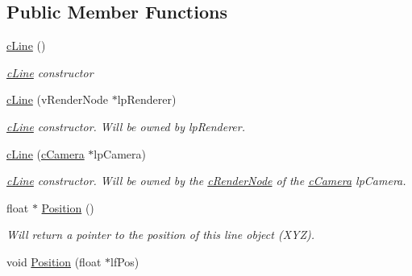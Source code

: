 \subsection*{Public Member Functions}
\begin{DoxyCompactItemize}
\item 
\hypertarget{classc_line_afc96602bef17f3d03af9685532af395d}{
\hyperlink{classc_line_afc96602bef17f3d03af9685532af395d}{cLine} ()}
\label{classc_line_afc96602bef17f3d03af9685532af395d}

\begin{DoxyCompactList}\small\item\em \hyperlink{classc_line}{cLine} constructor \end{DoxyCompactList}\item 
\hypertarget{classc_line_aa9c1d8af366fbcd7e5f71e82906a1b2c}{
\hyperlink{classc_line_aa9c1d8af366fbcd7e5f71e82906a1b2c}{cLine} (vRenderNode $\ast$lpRenderer)}
\label{classc_line_aa9c1d8af366fbcd7e5f71e82906a1b2c}

\begin{DoxyCompactList}\small\item\em \hyperlink{classc_line}{cLine} constructor. Will be owned by lpRenderer. \end{DoxyCompactList}\item 
\hypertarget{classc_line_a8a84cc1fe6a5a875faece391612347fc}{
\hyperlink{classc_line_a8a84cc1fe6a5a875faece391612347fc}{cLine} (\hyperlink{classc_camera}{cCamera} $\ast$lpCamera)}
\label{classc_line_a8a84cc1fe6a5a875faece391612347fc}

\begin{DoxyCompactList}\small\item\em \hyperlink{classc_line}{cLine} constructor. Will be owned by the \hyperlink{classc_render_node}{cRenderNode} of the \hyperlink{classc_camera}{cCamera} lpCamera. \end{DoxyCompactList}\item 
\hypertarget{classc_line_a32342ae3b470044b21f38f3fe3e0c232}{
float $\ast$ \hyperlink{classc_line_a32342ae3b470044b21f38f3fe3e0c232}{Position} ()}
\label{classc_line_a32342ae3b470044b21f38f3fe3e0c232}

\begin{DoxyCompactList}\small\item\em Will return a pointer to the position of this line object (XYZ). \end{DoxyCompactList}\item 
\hypertarget{classc_line_acfefe5128253475e8291d110f004095b}{
void \hyperlink{classc_line_acfefe5128253475e8291d110f004095b}{Position} (float $\ast$lfPos)}
\label{classc_line_acfefe5128253475e8291d110f004095b}


\end{DoxyCompactItemize}
